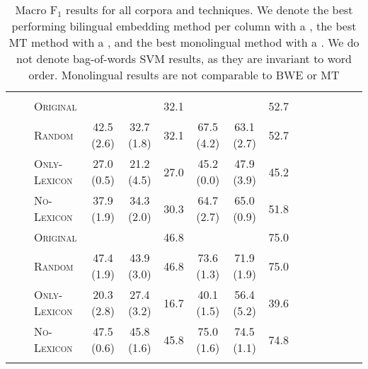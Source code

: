 \documentclass[a4paper,11pt,twocolumn,twoside]{article}
\newcommand{\original}{\textsc{Original}\xspace}
\newcommand{\random}{\textsc{Random}\xspace}
\newcommand{\onlylex}{\textsc{Only-Lexicon}\xspace}
\newcommand{\nolex}{\textsc{No-Lexicon}\xspace}
\newcommand{\rt}[1]{\rotatebox{90}{#1}}
\newcommand{\F}{$\text{F}_1$\xspace}
\begin{document}
\begin{table*}[th!]
\begin{tabular}{lllcccccccccccc}
\\[3pt]
\hline \\

\multirow{13}{*}{\rt{Monolingual}}
    & \multirow{4}{*}{\rt{ES}}
  		& \original  & \bestmono{43.2 \scriptsize{(3.3)}} & \bestmono{36.2 \scriptsize{(2.2)}} & 32.1  & \bestmono{68.5 \scriptsize{(3.4)}} & \bestmono{64.8 \scriptsize{(2.3)}} & 52.7 \\
		&& \random 	 & 42.5 \scriptsize{(2.6)} & 32.7 \scriptsize{(1.8)} & 32.1  & 67.5 \scriptsize{(4.2)} & 63.1 \scriptsize{(2.7)} & 52.7 \\ 
		&& \onlylex  & 27.0 \scriptsize{(0.5)} & 21.2 \scriptsize{(4.5)} & 27.0  & 45.2 \scriptsize{(0.0)} & 47.9 \scriptsize{(3.9)} & 45.2 \\ 
		&& \nolex 	 & 37.9 \scriptsize{(1.9)} & 34.3 \scriptsize{(2.0)} & 30.3  & 64.7 \scriptsize{(2.7)} & 65.0 \scriptsize{(0.9)} & 51.8 \\ 
		\sepp
	& \multirow{4}{*}{\rt{CA}}
  		& \original  & \bestmono{48.6 \scriptsize{(1.6)}} & \bestmono{46.2 \scriptsize{(0.8)}}  & 46.8  & \bestmono{77.1 \scriptsize{(1.3)}} & \bestmono{76.4 \scriptsize{(1.2)}} & 75.0  \\
		&& \random   & 47.4 \scriptsize{(1.9)} & 43.9 \scriptsize{(3.0)}  & 46.8  & 73.6 \scriptsize{(1.3)} & 71.9 \scriptsize{(1.9)} & 75.0  \\ 
		&& \onlylex  & 20.3 \scriptsize{(2.8)} & 27.4 \scriptsize{(3.2)}  & 16.7  & 40.1 \scriptsize{(1.5)} & 56.4 \scriptsize{(5.2)} & 39.6  \\ 
		&& \nolex    & 47.5 \scriptsize{(0.6)} & 45.8 \scriptsize{(1.6)}  & 45.8  & 75.0 \scriptsize{(1.6)} & 74.5 \scriptsize{(1.1)} & 74.8  \\ 
		
\\

\bottomrule
\end{tabular}
\caption{Macro \F results for all corpora and techniques. We denote
  the best performing bilingual embedding
  method per column with a , the best MT method with a , and the best monolingual method
  with a . We do not denote bag-of-words SVM results, as they are invariant to word order. Monolingual results are not comparable to BWE or MT}
\label{results:all}
\end{table*}
\end{document}

